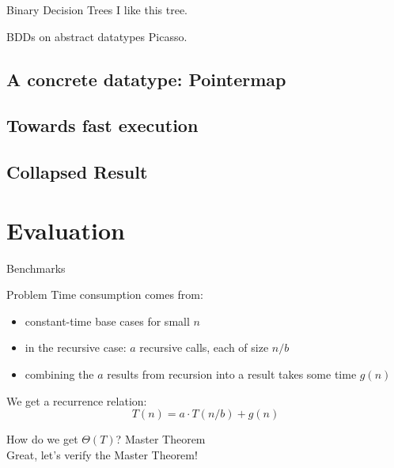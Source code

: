 \documentclass[%
	sans,
	12pt,
]{beamer}
\newcommand{\high}[1]{{\usebeamercolor[fg]{structure} #1}}
\begin{document}
\begin{frame}{Binary Decision Trees}
  I like this tree.
\end{frame}



\begin{frame}{BDDs on abstract datatypes}
  Picasso.
\end{frame}

\subsection{A concrete datatype: Pointermap}
\subsection{Towards fast execution}
\subsection{Collapsed Result}
\begin{frame}
\end{frame}
\section{Evaluation}
\begin{frame}{Benchmarks}
\end{frame}


\begin{frame}{Problem}
Time consumption comes from:\pause
\begin{itemize}
\item constant-time base cases for small $n$\pause
\item in the recursive case: $a$ recursive calls, each of size $n/b$\pause
\item combining the $a$ results from recursion into a result takes some time $g(n)$\pause
\end{itemize}
\vspace{2mm}

We get a recurrence relation:\\[-3mm]
\[T(n) = a\cdot T(n/b) + g(n)\]

How do we get $\Theta(T)$? \high{Master Theorem}\\\pause
Great, let's verify the Master Theorem!

\end{frame}
\end{document}
